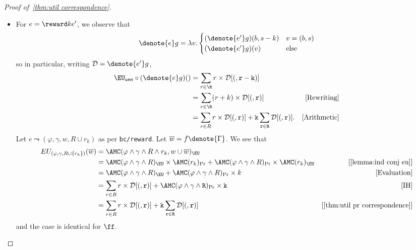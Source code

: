 \begin{proof}[Proof of~\cref{thm:util correspondence}]
\begin{itemize}[leftmargin=*]
    \item For $e = \reward k {e'}$, we observe that
    $$\denote{e}g = \lambda v. \begin{cases}
      (\denote{e'}g)(b,s-k) & v = (b,s)\\
      (\denote{e'}g)(v)  & \text{else}
    \end{cases} $$
    so in particular, writing $\mathcal D = \denote{e'}g$,
    \begin{align*}
      \EU_{\mathsf{unn}} \circ( \denote{e} g) (\tt)
        &= \sum_{r \in \R} r \times \mathcal D [(\tt, r - k)] &\\
        &= \sum_{r \in \R} (r + k) \times \mathcal D [(\tt, r)] &\text{[Rewriting]} \\
        &= \sum_{r \in R} r \times \mathcal D [(\tt, r)] 
          + k \sum_{r \in R}\mathcal D [(\tt, r)]. &\text{[Arithmetic]}
    \end{align*}
    Let $e \leadsto (\varphi, \gamma, w, R \cup r_k)$ as per \texttt{bc/reward}. Let $\overline w = f \denote{\Gamma}$. We see that
    \begin{align*}
      EU_{(\varphi, \gamma, R \cup \{r_k\})} (\overline w) 
        &=\AMC(\varphi \land \gamma \land R \land r_k, w \cup \overline w)_{\EU} &\\ 
        &=\AMC(\varphi \land \gamma \land R)_{\EU} \times \AMC(r_k)_{\Pr}
        + \AMC(\varphi \land \gamma \land R)_{\Pr} \times \AMC(r_k)_{\EU}
          &\text{[\cref{lemma:ind conj eu}]}\\
        &=\AMC(\varphi \land \gamma \land R)_{\EU}
          + \AMC(\varphi \land \gamma \land R)_{\Pr} \times k  
          &\text{[Evaluation]}\\
        &=\sum_{r \in R} r \times \mathcal D [(\tt, r)] + \AMC(\varphi \land \gamma \land R)_{\Pr} \times k
          &\text{[IH]}\\
        &=\sum_{r \in R} r \times \mathcal D [(\tt, r)] + k\sum_{r \in R} \mathcal D [(\tt, r)]  &\text{[\cref{thm:util pr correspondence}]}
    \end{align*}
    and the case is identical for $\ff$. 
    

\end{itemize}
\end{proof}
